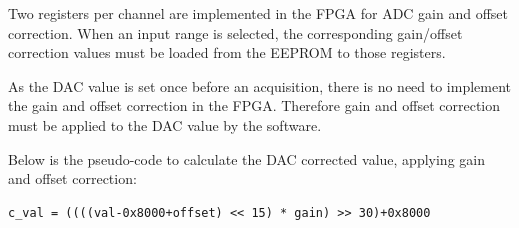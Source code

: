 \documentclass[11pt,a4paper]{article}
\begin{document}
Two registers per channel are implemented in the FPGA for ADC gain and offset correction.
When an input range is selected, the corresponding gain/offset correction values must be loaded from the EEPROM to those registers.

As the DAC value is set once before an acquisition, there is no need to implement the gain and offset correction in the FPGA.
Therefore gain and offset correction must be applied to the DAC value by the software.

Below is the pseudo-code to calculate the DAC corrected value, applying gain and offset correction:
\begin{verbatim}
c_val = ((((val-0x8000+offset) << 15) * gain) >> 30)+0x8000
\end{verbatim}
\end{document}
